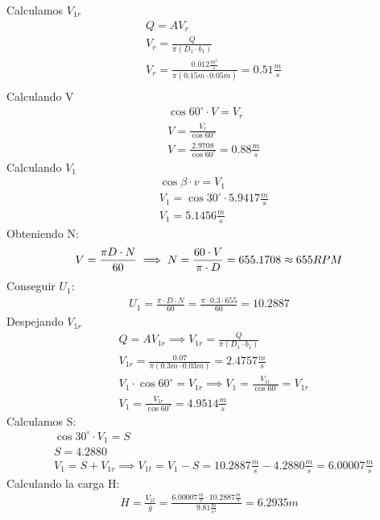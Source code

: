 Calculamos $V_{1r}$
\begin{align*}
    &Q = AV_r\\
    &V_r = \frac{Q}{\pi\left(D_1 \cdot b_1 \right)}\\
    &V_r = \frac{0.012\frac{m^3}{s}}{\pi\left(0.15m \cdot 0.05m  \right)} = 0.51 \frac{m}{s}\\
\end{align*}
Calculando V
\begin{align*}
    &\cos{60^{\circ}} \cdot  V = V_r\\
    &V = \frac{V_r}{\cos{60^{\circ}} }\\
    &V = \frac{2.9708}{\cos{60^{\circ}}}= 0.88 \frac{m}{s}
\end{align*}
Calculando $V_1$
\begin{align*}
    &\cos{\beta} \cdot v = V_1\\
    &V_1 = \cos{30^{\circ}} \cdot  5.9417 \frac{m}{s}\\
    &V_1 = 5.1456 \frac{m}{s}
\end{align*}
Obteniendo N:
\begin{equation*}
    V = \frac{\pi D \cdot N}{60} \implies N = \frac{60 \cdot V}{\pi \cdot D} = 655.1708 \approx 655 RPM\\
\end{equation*}
Conseguir $U_1$:
\begin{align*}
    U_1 = \frac{\pi \cdot D \cdot N }{60} = \frac{\pi \cdot 0.3 \cdot  655}{60} = 10.2887
\end{align*}
Despejando $V_{1r}$
\begin{align*}
    &Q = AV_{1r}\implies V_{1r}= \frac{Q}{\pi \left( D_1 \cdot b_1 \right)}\\
    &V_{1r}= \frac{0.07}{\pi\left( 0.3m \cdot 0.03m \right)} = 2.4757 \frac{m}{s}\\
    &V_1 \cdot \cos{60^{\circ}} = V_{1r}\implies V_1 = \frac{V_{1r}}{\cos{60^{\circ}}} = V_{1r}\\
    &V_1 = \frac{V_{1r}}{\cos{60^{\circ}}} = 4.9514 \frac{m}{s}
\end{align*}
Calculamos S:
\begin{align*}
    &\cos{30^{\circ}} \cdot  V_1 = S\\
    &S = 4.2880\\
    &V_1 = S +V_{1r}\implies V_{1t} = V_1 - S = 10.2887 \frac{m}{s} - 4.2880 \frac{m}{s} = 6.00007 \frac{m}{s}
\end{align*}
Calculando la carga H:
\begin{align*}
    H = \frac{V_{1t}}{g} = \frac{6.00007 \frac{m}{s} \cdot 10.2887 \frac{m}{s}}{9.81 \frac{m}{s^2}} = 6.2935m
\end{align*}
